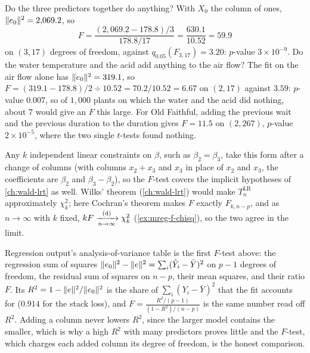 \begin{worked}
Do the three predictors together do anything? With $X_0$ the column of ones, $\lVert e_0\rVert^2 = 2{,}069.2$, so
\[
F = \frac{(2{,}069.2 - 178.8)/3}{178.8/17} = \frac{630.1}{10.52} = 59.9
\]
on $(3, 17)$ degrees of freedom, against $q_{0.05}(F_{3, 17}) = 3.20$: $p$-value $3 \times 10^{-9}$. Do the water temperature and the acid add anything to the air flow? The fit on the air flow alone has $\lVert e_0\rVert^2 = 319.1$, so $F = (319.1 - 178.8)/2 \div 10.52 = 70.2/10.52 = 6.67$ on $(2, 17)$ against $3.59$: $p$-value $0.007$, so of $1{,}000$ plants on which the water and the acid did nothing, about $7$ would give an $F$ this large. For Old Faithful, adding the previous wait and the previous duration to the duration gives $F = 11.5$ on $(2, 267)$, $p$-value $2 \times 10^{-5}$, where the two single $t$-tests found nothing.
\end{worked}

Any $k$ independent linear constraints on $\beta$, such as $\beta_2 = \beta_3$, take this form after a change of columns (with columns $x_2 + x_3$ and $x_3$ in place of $x_2$ and $x_3$, the coefficients are $\beta_2$ and $\beta_3 - \beta_2$), so the $F$-test covers the implicit hypotheses of \cref{ch:wald-lrt} as well.
Wilks' theorem (\cref{ch:wald-lrt}) would make $T^{\mathrm{LR}}_n$ approximately $\chi^2_k$; here Cochran's theorem makes $F$ exactly $F_{k, n-p}$, and as $n \to \infty$ with $k$ fixed, $kF \xrightarrow [n \to \infty ]{\text{(d)}} \chi^2_k$ (\cref{ex:mreg-f-chisq}), so the two agree in the limit.

\begin{bridge}
Regression output's analysis-of-variance table is the first $F$-test above: the regression sum of squares $\lVert e_0\rVert^2 - \lVert e\rVert^2 = \sum_i (\hat{Y}_i - \bar{Y})^2$ on $p - 1$ degrees of freedom, the residual sum of squares on $n - p$, their mean squares, and their ratio $F$. Its $R^2 = 1 - \lVert e\rVert^2/\lVert e_0\rVert^2$ is the share of $\sum_i (Y_i - \bar{Y})^2$ that the fit accounts for ($0.914$ for the stack loss), and $F = \frac{R^2/(p - 1)}{(1 - R^2)/(n - p)}$ is the same number read off $R^2$. Adding a column never lowers $R^2$, since the larger model contains the smaller, which is why a high $R^2$ with many predictors proves little and the $F$-test, which charges each added column its degree of freedom, is the honest comparison.
\end{bridge}

